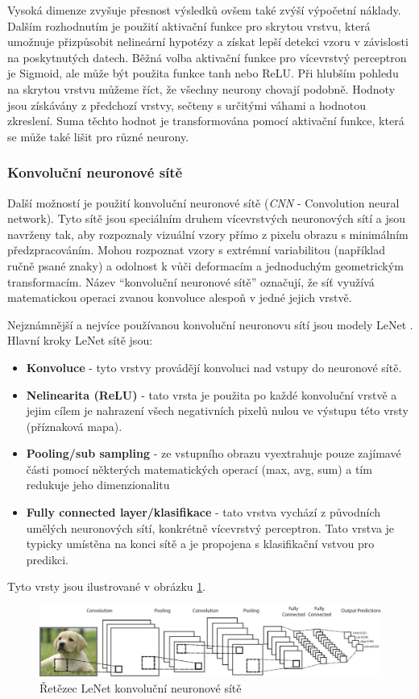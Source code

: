 Vysoká dimenze zvyšuje přesnost výsledků ovšem také zvýší výpočetní náklady. Dalším rozhodnutím je použití aktivační funkce pro skrytou vrstvu, která umožnuje přizpůsobit nelineární hypotézy a získat lepší detekci vzoru v závislosti na poskytnutých datech. Běžná volba aktivační funkce pro vícevrstvý perceptron je Sigmoid, ale může být použita funkce tanh nebo ReLU. Při hlubším pohledu na skrytou vrstvu můžeme říct, že všechny neurony chovají podobně. Hodnoty jsou získávány z předchozí vrstvy, sečteny s určitými váhami a hodnotou zkreslení.
Suma těchto hodnot je transformována pomocí aktivační funkce, která se může také lišit pro různé neurony.


\subsubsection*{Konvoluční neuronové sítě}
Další možností je použití konvoluční neuronové sítě (\textit{CNN} - Convolution neural network). Tyto sítě jsou speciálním druhem vícevrstvých neuronových sítí a jsou navrženy tak, aby rozpoznaly vizuální vzory přímo z pixelu obrazu s minimálním předzpracováním. Mohou rozpoznat vzory s extrémní variabilitou (například ručně psané znaky) a odolnost k vůči deformacím a jednoduchým geometrickým transformacím. Název ``konvoluční neuronové sítě'' označují, že síť využívá matematickou operaci zvanou konvoluce alespoň v jedné jejich vrstvě.

Nejznámnější a nejvíce používanou konvoluční neuronovu sítí jsou modely LeNet \cite{}.
Hlavní kroky LeNet sítě jsou:
\begin{itemize}
  \item{\textbf{Konvoluce} - tyto vrstvy provádějí konvoluci nad vstupy do neuronové sítě.} %
  \item{\textbf{Nelinearita (ReLU)} - tato vrsta je použita po každé konvoluční vrstvě a jejim cílem je nahrazení všech negativních pixelů nulou ve výstupu této vrsty (příznaková mapa).}
  \item{\textbf{Pooling/sub sampling} - ze vstupního obrazu vyextrahuje pouze zajímavé části pomocí některých matematických operací (max, avg, sum) a tím redukuje jeho dimenzionalitu}
  \item{\textbf{Fully connected layer/klasifikace} - tato vrstva vychází z původních umělých neuronových sítí, konkrétně vícevrstvý perceptron. Tato vrstva je typicky umístěna na konci sítě a je propojena s klasifikační vstvou pro predikci.}
\end{itemize}

Tyto vrsty jsou ilustrované v obrázku \ref{fig:cnn}.
\begin{figure}[H]
\centering
\includegraphics[width=1.\linewidth]{figures/cnn.pdf}
\caption{Řetězec LeNet konvoluční neuronové sítě}
\label{fig:cnn}
\end{figure}